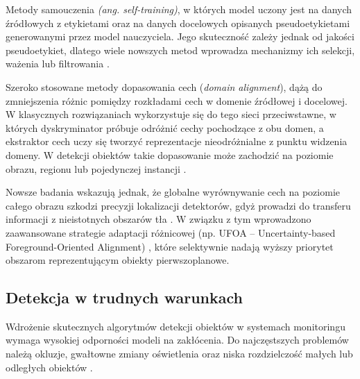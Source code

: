 Metody samouczenia \textit{(ang. self-training)}, w których model uczony jest na danych źródłowych
z etykietami oraz na danych docelowych opisanych pseudoetykietami generowanymi przez model
nauczyciela. Jego skuteczność zależy jednak od jakości pseudoetykiet, dlatego wiele nowszych metod
wprowadza mechanizmy ich selekcji, ważenia lub filtrowania \cite{he2024}.

Szeroko stosowane metody dopasowania cech (\textit{domain alignment}), dążą do zmniejszenia różnic
pomiędzy rozkładami cech w domenie źródłowej i docelowej. W klasycznych rozwiązaniach wykorzystuje
się do tego sieci przeciwstawne, w których dyskryminator próbuje odróżnić cechy pochodzące z obu
domen, a ekstraktor cech uczy się tworzyć reprezentacje nieodróżnialne z punktu widzenia domeny. W
detekcji obiektów takie dopasowanie może zachodzić na poziomie obrazu, regionu lub pojedynczej
instancji \cite{chen2018, he2024}.

Nowsze badania wskazują jednak, że globalne wyrównywanie cech na poziomie całego obrazu szkodzi
precyzji lokalizacji detektorów, gdyż prowadzi do transferu informacji z nieistotnych obszarów tła
\cite{he2024}. W związku z tym wprowadzono zaawansowane strategie adaptacji różnicowej (np. UFOA –
Uncertainty-based Foreground-Oriented Alignment) \cite{he2024}, które selektywnie nadają wyższy
priorytet obszarom reprezentującym obiekty pierwszoplanowe.

\subsection{Detekcja w trudnych warunkach}

Wdrożenie skutecznych algorytmów detekcji obiektów w systemach monitoringu wymaga wysokiej
odporności modeli na zakłócenia. Do najczęstszych problemów należą okluzje, gwałtowne zmiany
oświetlenia oraz niska rozdzielczość małych lub odległych obiektów \cite{nikouei2025, cheng2026}.

